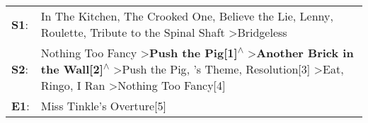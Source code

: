 \begin{supertabular}{p{0.03\textwidth}p{0.92\textwidth}}
 \textbf{S1}:  &                                                                                                                                                                                                             In The Kitchen\textsuperscript{}, \enspace The Crooked One\textsuperscript{}, \enspace Believe the Lie\textsuperscript{}, \enspace Lenny\textsuperscript{}, \enspace Roulette\textsuperscript{}, \enspace Tribute to the Spinal Shaft\textsuperscript{} \textgreater \enspace Bridgeless\textsuperscript{}  \enspace  \\
 \textbf{S2}:  &  Nothing Too Fancy\textsuperscript{} \textgreater \enspace \textbf{Push the Pig[1]\textsuperscript{$\wedge$}} \textgreater \enspace \textbf{Another Brick in the Wall[2]\textsuperscript{$\wedge$}} \textgreater \enspace Push the Pig\textsuperscript{}, 's Theme\textsuperscript{}, \enspace Resolution[3]\textsuperscript{} \textgreater \enspace Eat\textsuperscript{}, \enspace Ringo\textsuperscript{}, \enspace I Ran\textsuperscript{} \textgreater \enspace Nothing Too Fancy[4]\textsuperscript{}  \enspace  \\
 \textbf{E1}:  &                                                                                                                                                                                                                                                                                                                                                                                                                                                                            Miss Tinkle's Overture[5]\textsuperscript{}  \enspace  \\
\end{supertabular}
